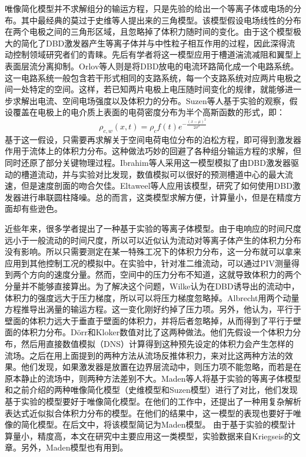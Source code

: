唯像简化模型并不求解组分的输运方程，只是先验的给出一个等离子体或电场的分布。其中最经典的莫过于史维等人提出来的三角模型\cite{shyy2002}。该模型假设电场线性的分布在两个电极之间的三角形区域，且忽略掉了体积力随时间的变化。由于这个模型极大的简化了DBD激发器产生等离子体并与中性粒子相互作用的过程，因此深得流动控制领域研究者们的青睐。先后有学者将这一模型应用于槽道湍流减阻\cite{LiZX2015}和翼型上表面层流分离抑制\cite{Rizzetta2011}。Orlov等人\cite{Orlov2006,Corke2008,Mertz2011}则是将DBD放电的电流环路简化成一个电路系统。这一电路系统一般包含若干形式相同的支路系统，每一个支路系统对应两片电极之间一处特定的空间。这样，若已知两片电极上电压随时间变化的规律，就能够进一步求解出电流、空间电场强度以及体积力的分布。Suzen等人\cite{suzen2005,suzen2007}基于实验\cite{Enloe2004,enloe2006}的观察，假设覆盖在电极上的电介质上表面的电荷密度分布为半个高斯函数的形式，即：
\begin{equation}\label{e:suzen}
  \rho_{c,w}(x,t)=\rho_cf(t)e^{-\frac{(x-\mu)^2}{2\sigma^2}}
\end{equation}
基于这一假设，只需要再求解关于空间电荷电位分布的泊松方程，即可得到激发器作用于流体上的体积力分布。这种做法巧妙的回避了各种组分输运方程的求解，但同时还原了部分关键物理过程。Ibrahim等人\cite{Ibrahim2014}采用这一模型模拟了由DBD激发器驱动的槽道流动，并与实验\cite{Debiasi2011}对比发现，数值模拟可以很好的预测槽道中心的最大流速，但是速度剖面的吻合欠佳。Eltaweel等人\cite{Eltaweel2014}应用该模型，研究了如何使用DBD激发器进行串联圆柱降噪。总的而言，这类模型求解方便，计算量小，但是在精度方面却有些逊色。

近些年来，很多学者提出了一种基于实验的等离子体模型\cite{albrecht2011method,Kotsonis2011,kriegseis2013velocity,Benard2014,wilke2009aerodynamische}。由于电响应的时间尺度远小于一般流动的时间尺度，所以可以近似认为流动对等离子体产生的体积力分布没有影响。所以只需要测定在某一特殊工况下的体积力分布，这一分布就可以拿来应用到其他控制工况的模拟中。在实验中，针对准二维流动，可以通过PIV测量得到两个方向的速度分量。然而，空间中的压力分布不知道，这就导致体积力的两个分量并不能够直接算出。为了解决这个问题，Wilke\cite{wilke2009aerodynamische}认为在DBD诱导出的流动中，体积力的强度远大于压力梯度，所以可以将压力梯度忽略掉。Albrecht\cite{albrecht2011method}用两个动量方程推导出涡量的输运方程。这一变化刚好约掉了压力项。另外，他认为，平行于壁面的体积力远大于垂直于壁面的体积力，并将后者忽略掉，从而得到了平行于壁面的体积力分布。D\"orr和Kloker\cite{dorr2015numerical}数值对比了这两种做法。他们先假设一个体积力分布，然后用直接数值模拟（DNS）计算得到这种预先设定的体积力会产生怎样的流场。之后在用上面提到的两种方法从流场反推体积力，来对比这两种方法的效果。他们发现，如果激发器是放置在边界层流动中，则压力项不能忽略，而若是在原本静止的流场中，则两种方法差别不大。Maden等人\cite{Maden2013}将基于实验的等离子体模型和之前介绍的两种唯像简化模型（史维模型\cite{shyy2002}和Suzen模型\cite{suzen2007}）进行了对比，他们发现基于实验的模型要好于唯像简化模型。在他们的工作中，还提出了一种用复杂解析表达式近似拟合体积力分布的模型。在他们的结果中，这一模型的表现也要好于唯像的简化模型。在后文中，将该模型简记为Maden模型。 由于基于实验的模型计算量小，精度高，本文在研究中主要应用这一类模型，实验数据来自Kriegseis\cite{kriegseis2013velocity}的文章。另外，Maden模型也有用到。

